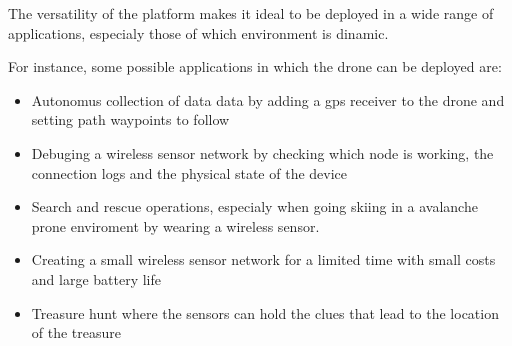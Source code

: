 \label{chap:future}

The versatility of the platform makes it ideal to be deployed in a wide range of applications, especialy those of which environment is dinamic.

For instance, some possible applications in which the drone can be deployed are:

 \begin{itemize} 

\item  Autonomus collection of data data by adding a gps receiver to the drone and setting path waypoints to follow\cite{fcint}

\item Debuging a wireless sensor network by checking which node is working, the connection logs and the physical state of the device

\item Search and rescue operations, especialy when going skiing in a avalanche prone enviroment by wearing a wireless sensor. 

\item Creating a small wireless sensor network for a limited time with small costs and large battery life

\item Treasure hunt where the sensors can hold the clues that lead to the location of the treasure

 
\end{itemize}


